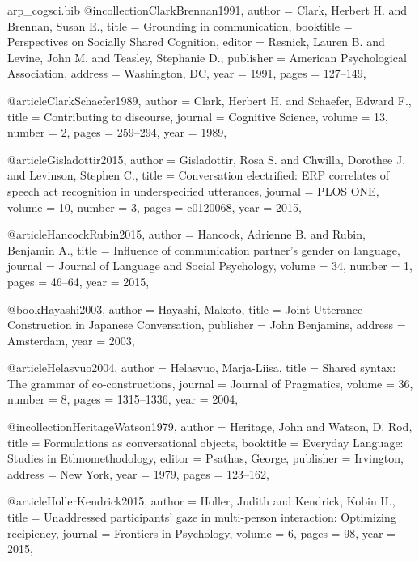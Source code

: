 \begin{filecontents*}[overwrite]{arp_cogsci.bib}
@incollection{ClarkBrennan1991,
  author    = {Clark, Herbert H. and Brennan, Susan E.},
  title     = {Grounding in communication},
  booktitle = {Perspectives on Socially Shared Cognition},
  editor    = {Resnick, Lauren B. and Levine, John M. and Teasley, Stephanie D.},
  publisher = {American Psychological Association},
  address   = {Washington, DC},
  year      = {1991},
  pages     = {127--149},
}

@article{ClarkSchaefer1989,
  author  = {Clark, Herbert H. and Schaefer, Edward F.},
  title   = {Contributing to discourse},
  journal = {Cognitive Science},
  volume  = {13},
  number  = {2},
  pages   = {259--294},
  year    = {1989},
}

@article{Gisladottir2015,
  author  = {Gisladottir, Rosa S. and Chwilla, Dorothee J. and Levinson, Stephen C.},
  title   = {Conversation electrified: {ERP} correlates of speech act recognition in underspecified utterances},
  journal = {PLOS ONE},
  volume  = {10},
  number  = {3},
  pages   = {e0120068},
  year    = {2015},
}

@article{HancockRubin2015,
  author  = {Hancock, Adrienne B. and Rubin, Benjamin A.},
  title   = {Influence of communication partner's gender on language},
  journal = {Journal of Language and Social Psychology},
  volume  = {34},
  number  = {1},
  pages   = {46--64},
  year    = {2015},
}

@book{Hayashi2003,
  author    = {Hayashi, Makoto},
  title     = {Joint Utterance Construction in {Japanese} Conversation},
  publisher = {John Benjamins},
  address   = {Amsterdam},
  year      = {2003},
}

@article{Helasvuo2004,
  author  = {Helasvuo, Marja-Liisa},
  title   = {Shared syntax: The grammar of co-constructions},
  journal = {Journal of Pragmatics},
  volume  = {36},
  number  = {8},
  pages   = {1315--1336},
  year    = {2004},
}

@incollection{HeritageWatson1979,
  author    = {Heritage, John and Watson, D. Rod},
  title     = {Formulations as conversational objects},
  booktitle = {Everyday Language: Studies in Ethnomethodology},
  editor    = {Psathas, George},
  publisher = {Irvington},
  address   = {New York},
  year      = {1979},
  pages     = {123--162},
}

@article{HollerKendrick2015,
  author  = {Holler, Judith and Kendrick, Kobin H.},
  title   = {Unaddressed participants' gaze in multi-person interaction: Optimizing recipiency},
  journal = {Frontiers in Psychology},
  volume  = {6},
  pages   = {98},
  year    = {2015},
}


\end{filecontents*}
